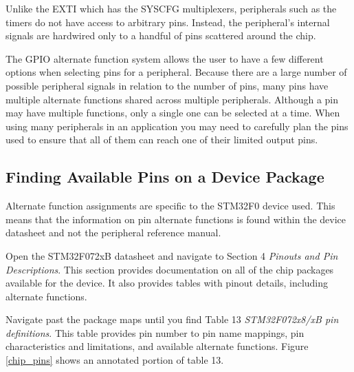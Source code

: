 \documentclass[openany,11pt,fleqn]{book} %
\begin{document}
Unlike the EXTI which has the SYSCFG multiplexers, peripherals such as the timers do not have access to arbitrary pins. Instead, the peripheral's internal signals are hardwired only to a handful of pins scattered around the chip. 

The GPIO alternate function system allows the user to have a few different options when selecting pins for a peripheral. Because there are a large number of possible peripheral signals in relation to the number of pins, many pins have multiple alternate functions shared across multiple peripherals. Although a pin may have multiple functions, only a single one can be selected at a time. When using many peripherals in an application you may need to carefully plan the pins used to ensure that all of them can reach one of their limited output pins.  

%    
    
    \subsection{Finding Available Pins on a Device Package}
    
    Alternate function assignments are specific to the STM32F0 device used. This means that the information on pin alternate functions is found within the device datasheet and not the peripheral reference manual.
    
    Open the STM32F072xB datasheet and navigate to Section 4 \textit{Pinouts and Pin Descriptions}. This section provides documentation on all of the chip packages available for the device. It also provides tables with pinout details, including alternate functions.
    
    Navigate past the package maps until you find Table 13 \textit{STM32F072x8/xB pin definitions}. This table provides pin number to pin name mappings, pin characteristics and limitations, and available alternate functions. Figure \ref{chip_pins} shows an annotated portion of table 13. 
    
\end{document}
